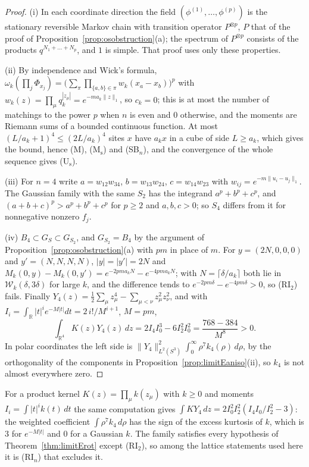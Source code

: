 \documentclass[aps,prd,twocolumn,superscriptaddress,nofootinbib,longbibliography,floatfix,amsmath,amssymb,10pt]{revtex4-2}
\theoremstyle{definition}
\theoremstyle{remark}
\newcommand{\R}{\mathbb{R}}
\begin{document}
\begin{proof}
(i) In each coordinate direction the field $(\phi^{(1)},\dots,\phi^{(p)})$
is the stationary reversible Markov chain with transition operator
$P^{\otimes p}$, $P$ that of the proof of
Proposition~\ref{prop:osobstruction}(a); the spectrum of $P^{\otimes p}$
consists of the products $q^{N_1+\dots+N_p}$, and $1$ is simple. That proof
uses only these properties.

(ii) By independence and Wick's formula, $\omega_k(\prod_j\Phi_{x_j})=
\bigl(\sum_\pi\prod_{\{a,b\}\in\pi}w_k(x_a-x_b)\bigr)^p$ with $w_k(z)=
\prod_\mu q_k^{|z_\mu|}=e^{-ma_k\|z\|_1}$, so $c_k=0$; this is at most the
number of matchings to the power $p$ when $n$ is even and $0$ otherwise,
and the moments are Riemann sums of a bounded continuous function. At most
$(L/a_k+1)^4\le(2L/a_k)^4$ sites $x$ have $a_kx$ in a cube of side $L\ge
a_k$, which gives the bound, hence (M), (M$_{\mathrm s}$) and (SB$_n$), and
the convergence of the whole sequence gives (U$_{\mathrm s}$).

(iii) For $n=4$ write $a=w_{12}w_{34}$, $b=w_{13}w_{24}$, $c=w_{14}w_{23}$
with $w_{ij}=e^{-m\|u_i-u_j\|_1}$. The Gaussian family with the same $S_2$
has the integrand $a^p+b^p+c^p$, and $(a+b+c)^p>a^p+b^p+c^p$ for $p\ge2$ and
$a,b,c>0$; so $S_4$ differs from it for nonnegative nonzero $f_j$.

(iv) $B_4\subset G_S\subset G_{S_2}$, and $G_{S_2}=B_4$ by the argument of
Proposition~\ref{prop:osobstruction}(a) with $pm$ in place of $m$. For
$y=(2N,0,0,0)$ and $y'=(N,N,N,N)$, $|y|=|y'|=2N$ and $M_k(0,y)-M_k(0,y')=
e^{-2pma_kN}-e^{-4pma_kN}$; with $N=\lceil\delta/a_k\rceil$ both lie in
$\mathcal W_k(\delta,3\delta)$ for large $k$, and the difference tends to
$e^{-2pm\delta}-e^{-4pm\delta}>0$, so (RI$_2$) fails. Finally
$Y_4(z)=\frac12\sum_\mu z_\mu^4-\sum_{\mu<\nu}z_\mu^2z_\nu^2$, and with
$I_i=\int_\R|t|^ie^{-M|t|}dt=2\,i!/M^{i+1}$, $M=pm$,
\[
\int_{\R^4}K(z)Y_4(z)\,dz=2I_4I_0^3-6I_2^2I_0^2=\frac{768-384}{M^8}>0 .
\]
In polar coordinates the left side is $\|Y_4\|^2_{L^2(S^3)}\int_0^\infty
\rho^7k_4(\rho)\,d\rho$, by the orthogonality of the components in
Proposition~\ref{prop:limitEaniso}(ii), so $k_4$ is not almost everywhere
zero.
\end{proof}

For a product kernel $K(z)=\prod_\mu k(z_\mu)$ with $k\ge0$ and moments
$I_i=\int|t|^ik(t)\,dt$ the same computation gives $\int KY_4\,dz=2I_0^2
I_2^2(I_4I_0/I_2^2-3)$: the weighted coefficient $\int\rho^7k_4\,d\rho$
has the sign of the excess kurtosis of $k$, which is $3$ for $e^{-M|t|}$
and $0$ for a Gaussian $k$. The family satisfies every hypothesis of
Theorem~\ref{thm:limitErot} except (RI$_2$), so among the lattice
statements used here it is (RI$_n$) that excludes it.
\end{document}
